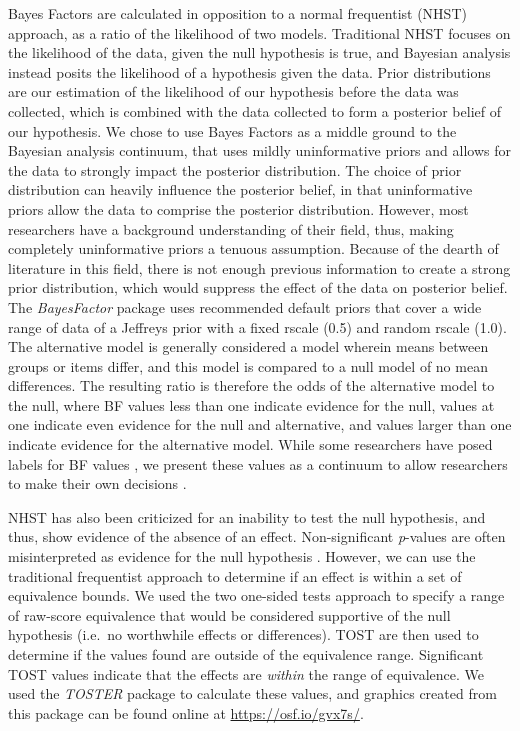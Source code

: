 \documentclass[english,man, mask]{apa6}
\theoremstyle{definition}
\theoremstyle{definition}
\theoremstyle{definition}
\theoremstyle{remark}
\begin{document}
Bayes Factors are calculated in opposition to a normal frequentist
(NHST) approach, as a ratio of the likelihood of two models. Traditional
NHST focuses on the likelihood of the data, given the null hypothesis is
true, and Bayesian analysis instead posits the likelihood of a
hypothesis given the data. Prior distributions are our estimation of the
likelihood of our hypothesis before the data was collected, which is
combined with the data collected to form a posterior belief of our
hypothesis. We chose to use Bayes Factors as a middle ground to the
Bayesian analysis continuum, that uses mildly uninformative priors and
allows for the data to strongly impact the posterior distribution. The
choice of prior distribution can heavily influence the posterior belief,
in that uninformative priors allow the data to comprise the posterior
distribution. However, most researchers have a background understanding
of their field, thus, making completely uninformative priors a tenuous
assumption. Because of the dearth of literature in this field, there is
not enough previous information to create a strong prior distribution,
which would suppress the effect of the data on posterior belief. The
\emph{BayesFactor} package \autocite{Morey2015b} uses recommended
default priors that cover a wide range of data
\autocites{Morey2015b}{Rouder2009} of a Jeffreys prior with a fixed
rscale (0.5) and random rscale (1.0). The alternative model is generally
considered a model wherein means between groups or items differ, and
this model is compared to a null model of no mean differences. The
resulting ratio is therefore the odds of the alternative model to the
null, where BF values less than one indicate evidence for the null,
values at one indicate even evidence for the null and alternative, and
values larger than one indicate evidence for the alternative model.
While some researchers have posed labels for BF values
\autocite{Kass1995}, we present these values as a continuum to allow
researchers to make their own decisions
\autocites{Morey2015b}{Morey2015c}.

NHST has also been criticized for an inability to test the null
hypothesis, and thus, show evidence of the absence of an effect.
Non-significant \emph{p}-values are often misinterpreted as evidence for
the null hypothesis \autocite{Lakens2017a}. However, we can use the
traditional frequentist approach to determine if an effect is within a
set of equivalence bounds. We used the two one-sided tests approach to
specify a range of raw-score equivalence that would be considered
supportive of the null hypothesis (i.e.~no worthwhile effects or
differences). TOST are then used to determine if the values found are
outside of the equivalence range. Significant TOST values indicate that
the effects are \emph{within} the range of equivalence. We used the
\emph{TOSTER} package \autocite{Lakens2017a} to calculate these values,
and graphics created from this package can be found online at
\url{https://osf.io/gvx7s/}.
\end{document}
